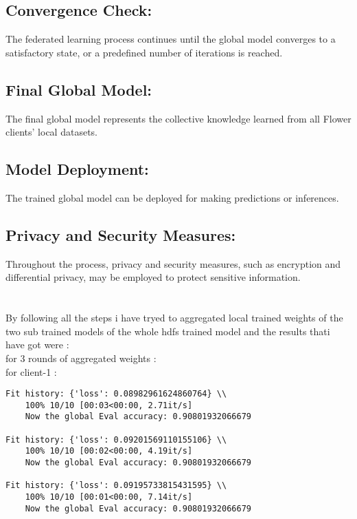 \documentclass[titlepage]{article}
\begin{document}
\subsection{Convergence Check:}
The federated learning process continues until the global model converges to a satisfactory state, or a predefined number of iterations is reached.

\subsection{Final Global Model:}
The final global model represents the collective knowledge learned from all Flower clients' local datasets.

\subsection{Model Deployment:}
The trained global model can be deployed for making predictions or inferences.

\subsection{Privacy and Security Measures:}
Throughout the process, privacy and security measures, such as encryption and differential privacy, may be employed to protect sensitive information.
\\ \\ \\
By following all the steps i have tryed to aggregated local trained weights of the two sub trained models of the whole hdfs trained model and the results thati have got were :
\\
for 3 rounds of aggregated weights : \\
	for client-1 : \\
	\begin{verbatim}
Fit history: {'loss': 0.08982961624860764} \\
    100% 10/10 [00:03<00:00, 2.71it/s]
    Now the global Eval accuracy: 0.90801932066679

Fit history: {'loss': 0.09201569110155106} \\
    100% 10/10 [00:02<00:00, 4.19it/s]
    Now the global Eval accuracy: 0.90801932066679

Fit history: {'loss': 0.09195733815431595} \\
    100% 10/10 [00:01<00:00, 7.14it/s]
    Now the global Eval accuracy: 0.90801932066679
\end{verbatim}
\end{document}
